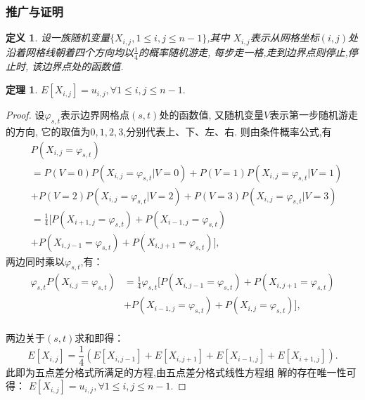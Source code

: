 \documentclass[UTF8,a4paper,notitlepage]{ctexart}%
\newtheorem{definition}{定义}
\newtheorem{thm}{定理}[section]
\theoremstyle{nonumberplain}
\newtheorem{proof}{证明}%
\begin{document}
\subsubsection*{推广与证明}
\begin{definition}
    设一族随机变量$\{X_{i,j},1\leq i,j\leq n-1\}$,其中
$X_{i,j}$表示从网格坐标$(i,j)$处沿着网格线朝着四个方向均以$\frac{1}{4}$的概率随机游走,
每步走一格,走到边界点则停止,停止时,
该边界点处的函数值.
\end{definition}
\begin{thm}
    $E[X_{i,j}]=u_{i,j},\forall 1\leq i,j \leq n-1.$
\end{thm}
\begin{proof}
    设$\varphi _{s,t}$表示边界网格点$(s,t)$处的函数值,
    又随机变量$V$表示第一步随机游走的方向,
    它的取值为$0,1,2,3$,分别代表上、下、左、右.
    则由条件概率公式,有
\begin{equation}
    \begin{split}
        &P(X_{i,j}=\varphi _{s,t})\\
        &=P(V=0)P(X_{i,j}=\varphi _{s,t}|V=0)
         + P(V=1)P(X_{i,j}=\varphi _{s,t}|V=1)\\
         &+ P(V=2)P(X_{i,j}=\varphi _{s,t}|V=2)
    + P(V=3)P(X_{i,j}=\varphi _{s,t}|V=3) \\
    &=\frac{1}{4}[P(X_{i+1,j}=\varphi _{s,t})
         + P(X_{i-1,j}=\varphi _{s,t})\\
         &+ P(X_{i,j-1}=\varphi _{s,t})
    + P(X_{i,j+1}=\varphi _{s,t}) ],
    \nonumber
    \end{split} 
\end{equation} 
两边同时乘以$\varphi _{s,t}$,有：
\begin{equation}
    \begin{split}
        \varphi _{s,t}P(X_{i,j}=\varphi _{s,t})
        &=\frac{1}{4}\varphi _{s,t}[P(X_{i,j-1}=\varphi _{s,t})
         + P(X_{i,j+1}=\varphi _{s,t})\\
         &+ P(X_{i-1,j}=\varphi _{s,t})
    + P(X_{i,j}=\varphi _{s,t})],\nonumber
    \end{split} 
\end{equation}\\
两边关于$(s,t)$求和即得：
\begin{equation}
    E[X_{i,j}]=\frac{1}{4}(
        E[X_{i,j-1}]+E[X_{i,j+1}]+
        E[X_{i-1,j}]+E[X_{i+1,j}]).\nonumber
\end{equation}
此即为五点差分格式所满足的方程,由五点差分格式线性方程组
解的存在唯一性可得：
$E[X_{i,j}]=u_{i,j},\forall 1\leq i,j \leq n-1.$
\end{proof} 
\end{document}
